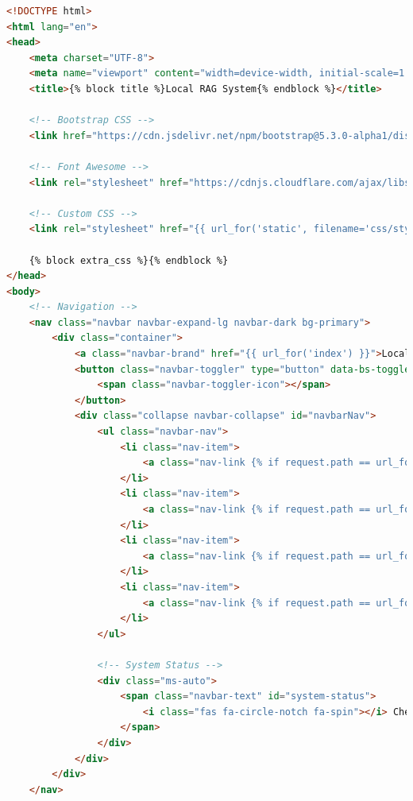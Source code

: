\documentclass[
  screen,review,acmlarge]{acmart}
\begin{document}
\begin{lstlisting}[language=HTML]
<!DOCTYPE html>
<html lang="en">
<head>
    <meta charset="UTF-8">
    <meta name="viewport" content="width=device-width, initial-scale=1.0">
    <title>{% block title %}Local RAG System{% endblock %}</title>
    
    <!-- Bootstrap CSS -->
    <link href="https://cdn.jsdelivr.net/npm/bootstrap@5.3.0-alpha1/dist/css/bootstrap.min.css" rel="stylesheet">
    
    <!-- Font Awesome -->
    <link rel="stylesheet" href="https://cdnjs.cloudflare.com/ajax/libs/font-awesome/6.0.0/css/all.min.css">
    
    <!-- Custom CSS -->
    <link rel="stylesheet" href="{{ url_for('static', filename='css/style.css') }}">
    
    {% block extra_css %}{% endblock %}
</head>
<body>
    <!-- Navigation -->
    <nav class="navbar navbar-expand-lg navbar-dark bg-primary">
        <div class="container">
            <a class="navbar-brand" href="{{ url_for('index') }}">Local RAG System</a>
            <button class="navbar-toggler" type="button" data-bs-toggle="collapse" data-bs-target="#navbarNav">
                <span class="navbar-toggler-icon"></span>
            </button>
            <div class="collapse navbar-collapse" id="navbarNav">
                <ul class="navbar-nav">
                    <li class="nav-item">
                        <a class="nav-link {% if request.path == url_for('index') %}active{% endif %}" href="{{ url_for('index') }}">Home</a>
                    </li>
                    <li class="nav-item">
                        <a class="nav-link {% if request.path == url_for('upload') %}active{% endif %}" href="{{ url_for('upload') }}">Upload</a>
                    </li>
                    <li class="nav-item">
                        <a class="nav-link {% if request.path == url_for('documents') %}active{% endif %}" href="{{ url_for('documents') }}">Documents</a>
                    </li>
                    <li class="nav-item">
                        <a class="nav-link {% if request.path == url_for('ask') %}active{% endif %}" href="{{ url_for('ask') }}">Ask Questions</a>
                    </li>
                </ul>
                
                <!-- System Status -->
                <div class="ms-auto">
                    <span class="navbar-text" id="system-status">
                        <i class="fas fa-circle-notch fa-spin"></i> Checking system status...
                    </span>
                </div>
            </div>
        </div>
    </nav>
    

\end{lstlisting}
\end{document}
